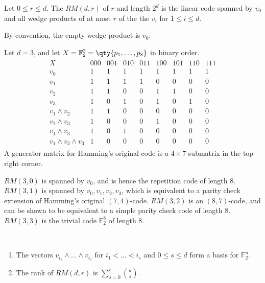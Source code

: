 \begin{definition}
    Let $0 \leq r \leq d$.
    The  $RM(d,r)$ of  $r$ and length $2^d$ is the linear code spanned by $v_0$ and all wedge products of at most $r$ of the the $v_i$ for $1 \leq i \leq d$.
\end{definition}

By convention, the empty wedge product is $v_0$.

\begin{example}
    Let $d = 3$, and let $X = \mathbb F_2^3 = \qty{p_1, \dots, p_8}$ in binary order.
    \begin{align*}
        \begin{array}{c|cccccccc}
            X & 000 & 001 & 010 & 011 & 100 & 101 & 110 & 111 \\\hline
            v_0 & 1 & 1 & 1 & 1 & 1 & 1 & 1 & 1 \\
            v_1 & 1 & 1 & 1 & 1 & 0 & 0 & 0 & 0 \\
            v_2 & 1 & 1 & 0 & 0 & 1 & 1 & 0 & 0 \\
            v_3 & 1 & 0 & 1 & 0 & 1 & 0 & 1 & 0 \\
            v_1 \wedge v_2 & 1 & 1 & 0 & 0 & 0 & 0 & 0 & 0 \\
            v_2 \wedge v_3 & 1 & 0 & 0 & 0 & 1 & 0 & 0 & 0 \\
            v_1 \wedge v_3 & 1 & 0 & 1 & 0 & 0 & 0 & 0 & 0 \\
            v_1 \wedge v_2 \wedge v_3 & 1 & 0 & 0 & 0 & 0 & 0 & 0 & 0
        \end{array}
    \end{align*}
    A generator matrix for Hamming's original code is a $4 \times 7$ submatrix in the top-right corner.
\end{example}

$RM(3,0)$ is spanned by $v_0$, and is hence the repetition code of length 8.
$RM(3,1)$ is spanned by $v_0, v_1, v_2, v_3$, which is equivalent to a parity check extension of Hamming's original $(7,4)$-code.
$RM(3,2)$ is an $(8,7)$-code, and can be shown to be equivalent to a simple parity check code of length 8.
$RM(3,3)$ is the trivial code $\mathbb F_2^8$ of length 8.

\begin{theorem} ~\vspace*{-1.5\baselineskip}
    \begin{enumerate}
        \item The vectors $v_{i_1} \wedge \dots \wedge v_{i_s}$ for $i_1 < \dots < i_s$ and $0 \leq s \leq d$ form a basis for $\mathbb F_2^n$.
        \item The rank of $RM(d,r)$ is $\sum_{s=0}^r \binom{d}{s}$.
    \end{enumerate}
\end{theorem}

